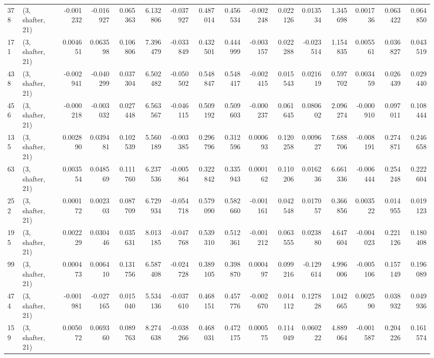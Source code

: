 \begin{tabular}{llrrrrrrrrrrrrrr}
378 &  (3, shafter, 21) &  -0.001232 & -0.016927 &  0.065363 &     6.132806 &  -0.037927 &   0.487014 &   0.456534 & -0.002248 &  0.022126 &  0.013534 &    1.345698 &  0.001736 &  0.063422 &  0.064850 \\
171 &  (3, shafter, 21) &   0.004651 &  0.063598 &  0.106806 &     7.396479 &  -0.033849 &   0.432501 &   0.444999 & -0.003157 &  0.022288 & -0.023514 &    1.154835 &  0.005561 &  0.036827 &  0.043519 \\
438 &  (3, shafter, 21) &  -0.002941 & -0.040299 &  0.037304 &     6.502482 &  -0.050502 &   0.548847 &   0.548417 & -0.002415 &  0.015543 &  0.021619 &    0.597702 &  0.003459 &  0.026439 &  0.029440 \\
456 &  (3, shafter, 21) &  -0.000218 & -0.003032 &  0.027448 &     6.563567 &  -0.046115 &   0.509192 &   0.509603 & -0.000237 &  0.061645 &  0.080602 &    2.096274 & -0.000910 &  0.097011 &  0.108444 \\
135 &  (3, shafter, 21) &   0.002890 &  0.039481 &  0.102539 &     5.560189 &  -0.003385 &   0.296796 &   0.312596 &  0.000693 &  0.120258 &  0.009627 &    7.688706 & -0.008191 &  0.274871 &  0.246658 \\
63  &  (3, shafter, 21) &   0.003554 &  0.048569 &  0.111760 &     6.237536 &  -0.005864 &   0.322842 &   0.335943 &  0.000162 &  0.110206 &  0.016236 &    6.661336 & -0.006444 &  0.254248 &  0.222604 \\
252 &  (3, shafter, 21) &   0.000172 &  0.002303 &  0.087709 &     6.729934 &  -0.054718 &   0.579090 &   0.582660 & -0.001161 &  0.042548 &  0.017057 &    0.366856 &  0.003522 &  0.014955 &  0.019123 \\
195 &  (3, shafter, 21) &   0.002229 &  0.030446 &  0.035631 &     8.013185 &  -0.047768 &   0.539310 &   0.512361 & -0.001212 &  0.063555 &  0.023880 &    4.647604 & -0.004023 &  0.221126 &  0.180408 \\
99  &  (3, shafter, 21) &   0.000473 &  0.006410 &  0.131756 &     6.587408 &  -0.024728 &   0.389105 &   0.398870 &  0.000497 &  0.099216 & -0.129614 &    4.996006 & -0.005106 &  0.157149 &  0.196089 \\
474 &  (3, shafter, 21) &  -0.001981 & -0.027165 &  0.015040 &     5.534136 &  -0.037610 &   0.468151 &   0.457776 & -0.002670 &  0.014112 &  0.127828 &    1.042665 &  0.002590 &  0.038932 &  0.049936 \\
159 &  (3, shafter, 21) &   0.005072 &  0.069360 &  0.089763 &     8.274638 &  -0.038266 &   0.468031 &   0.472175 &  0.000575 &  0.114049 &  0.060222 &    4.889064 & -0.001587 &  0.204226 &  0.161574 \\

\end{tabular}
